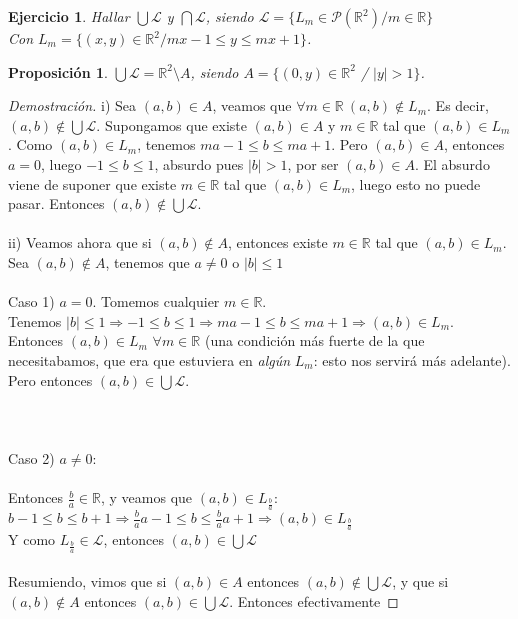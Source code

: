 \documentclass{article}
\newtheorem*{ejercicio}{Ejercicio}
\newtheorem*{proposicion}{Proposición}
\begin{document}
\begin{ejercicio}
Hallar $\bigcup\mathscr{L}$ y $\bigcap\mathscr{L}$, siendo  $\mathscr{L} = \{L_m \in \mathcal{P}(\mathbb{R}^2) / m \in \mathbb{R}\}$\\
Con $L_m = \{(x,y) \in \mathbb{R}^2 / mx - 1 \le y \le mx + 1\}$.
\end{ejercicio}
\begin{proposicion}
$\bigcup\mathscr{L} = \mathbb{R}^2 \setminus A$, siendo $A = \{(0,y) \in  \mathbb{R}^2$ / $ |y| > 1 \}$.
\end{proposicion}

\begin{proof}[Demostración]
i) Sea $(a,b) \in A$, veamos que $\forall m \in \mathbb{R}\ (a,b) \notin L_m$. Es decir, $(a,b) \notin \bigcup\mathscr{L}$. Supongamos que existe $(a,b) \in A$ y $m \in \mathbb{R}$ tal que $(a,b) \in L_m$. Como $(a,b) \in L_m$, tenemos $ma - 1 \le b \le ma + 1$. Pero $(a,b) \in A$, entonces $a = 0$, luego $-1 \le b \le 1$, absurdo pues $|b| > 1$, por ser $(a,b) \in A$. El absurdo viene de suponer que existe $m \in \mathbb{R}$ tal que $(a,b) \in L_m$, luego esto no puede pasar. Entonces $(a,b) \notin \bigcup\mathscr{L}$. \\ \\
ii) Veamos ahora que si $(a,b) \notin A$, entonces existe $m \in \mathbb{R}$ tal que $(a,b) \in L_m$. Sea $(a,b) \notin A$, tenemos que $a \ne 0$ o $|b| \le 1$ \\ \\
Caso 1) $a = 0$. Tomemos cualquier $m \in \mathbb{R}$. \\

Tenemos $|b| \le 1 \Rightarrow -1 \le b \le 1 \Rightarrow ma - 1 \le b \le ma + 1 \Rightarrow (a,b) \in L_m$. Entonces $(a,b) \in L_m$ $\forall m \in \mathbb{R}$ (una condición más fuerte de la que necesitabamos, que era que estuviera en \textit{algún} $L_m$: esto nos servirá más adelante). Pero entonces $(a,b) \in \bigcup\mathscr{L}$. 
\\ \\ \\ \\

Caso 2) $a \ne 0$: \\ \\
Entonces $\frac{b}{a} \in \mathbb{R}$, y veamos que $(a,b) \in L_\frac{b}{a}$:\\ $ b - 1 \le b \le b + 1 \Rightarrow \frac{b}{a}a - 1 \le b \le \frac{b}{a}a + 1 \Rightarrow (a,b) \in L_\frac{b}{a}$ \\ Y como $L_\frac{b}{a} \in \mathscr{L}$, entonces $(a,b) \in \bigcup\mathscr{L}$ \\ \\
Resumiendo, vimos que si $(a,b) \in A$ entonces $(a,b) \notin \bigcup\mathscr{L}$, y que si $(a,b) \notin A$ entonces $(a,b) \in \bigcup\mathscr{L}$. Entonces efectivamente 
\end{proof}
\end{document}
